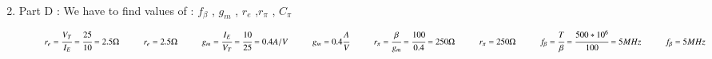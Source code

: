 \begin{enumerate}[label=\thesubsection.\arabic*.,ref=\thesubsection.\theenumi]
\begin{align}
\end{align}

\item
Part D : We have to find values of :
 $f_{\beta}$ , $g_{m}$ , $r_{e}$ ,$r_{\pi}$ , $C_{\pi}$
 
  \vspace{0.5cm}
  
 \solution

\begin{align}

\hspace{1cm}        r_{e} = \cfrac{V_{T}}{I_{E}}
              = \cfrac{25}{10}
              = 2.5 \ohm
 
 \vspace{0.5cm}
 
\hspace{1cm}      r_{e} = 2.5 \ohm
      
      \vspace{1cm}

\hspace{1cm}      g_{m} = \cfrac{I_{E}}{V_{T}}
        = \cfrac{10}{25}
        = 0.4 A/V
        
        \vspace{0.5cm}
        
\hspace{1cm}        g_{m}= 0.4 \cfrac{A}{V}
        
        \vspace{1cm}

     
\hspace{1cm}       r_{\pi} = \cfrac{\beta}{g_{m}}
               = \cfrac{100}{0.4}
               = 250\ohm
            
            \vspace{0.5cm}
            
\hspace{1cm}         r_{\pi} = 250\ohm
         
         \vspace{1cm}
     
\hspace{1cm}  f_{\beta} = \cfrac{{T}}{\beta}
        = \cfrac{500*{10^6}}{100}
        = 5 MHz
        
        \vspace{0.5cm}
        
\hspace{1cm}        f_{\beta} = 5 MHz

\vspace{1cm}


\end{align}
\end{enumerate}
